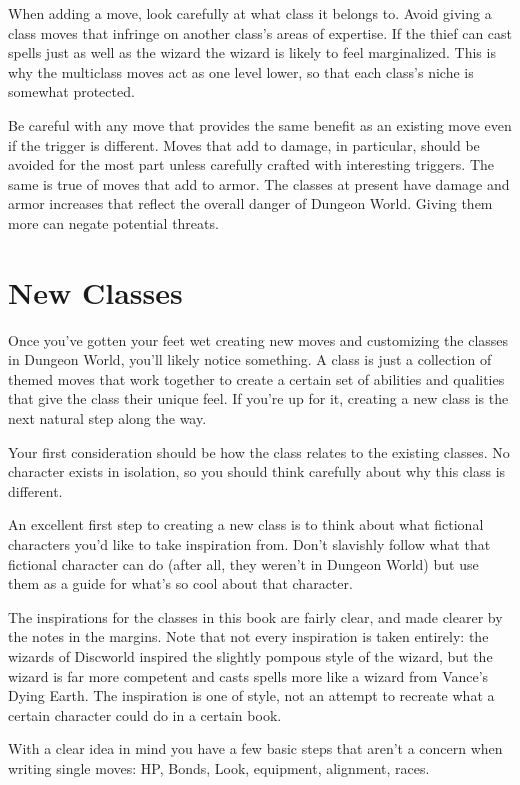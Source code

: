 When adding a move, look carefully at what class it belongs to. Avoid giving a class moves that infringe on another class's areas of expertise. If the thief can cast spells just as well as the wizard the wizard is likely to feel marginalized. This is why the multiclass moves act as one level lower, so that each class's niche is somewhat protected.


Be careful with any move that provides the same benefit as an existing move even if the trigger is different. Moves that add to damage, in particular, should be avoided for the most part unless carefully crafted with interesting triggers. The same is true of moves that add to armor. The classes at present have damage and armor increases that reflect the overall danger of Dungeon World. Giving them more can negate potential threats.
\section*{New Classes} 


Once you've gotten your feet wet creating new moves and customizing the classes in Dungeon World, you'll likely notice something. A class is just a collection of themed moves that work together to create a certain set of abilities and qualities that give the class their unique feel. If you're up for it, creating a new class is the next natural step along the way.


Your first consideration should be how the class relates to the existing classes. No character exists in isolation, so you should think carefully about why this class is different.


An excellent first step to creating a new class is to think about what fictional characters you'd like to take inspiration from. Don't slavishly follow what that fictional character can do (after all, they weren't in Dungeon World) but use them as a guide for what's so cool about that character.


The inspirations for the classes in this book are fairly clear, and made clearer by the notes in the margins. Note that not every inspiration is taken entirely: the wizards of Discworld inspired the slightly pompous style of the wizard, but the wizard is far more competent and casts spells more like a wizard from Vance's Dying Earth. The inspiration is one of style, not an attempt to recreate what a certain character could do in a certain book.


With a clear idea in mind you have a few basic steps that aren't a concern when writing single moves: HP, Bonds, Look, equipment, alignment, races.



